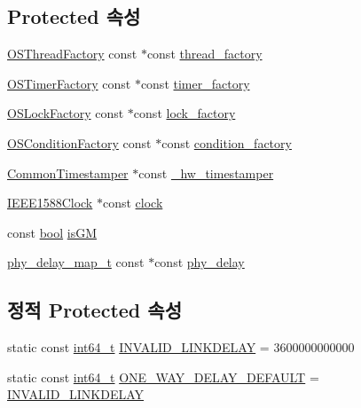 \subsection*{Protected 속성}
\begin{DoxyCompactItemize}
\item 
\hyperlink{class_o_s_thread_factory}{O\+S\+Thread\+Factory} const $\ast$const \hyperlink{class_common_port_a2268fc1f22a57c22f52a6cd1a2d2c609}{thread\+\_\+factory}
\item 
\hyperlink{class_o_s_timer_factory}{O\+S\+Timer\+Factory} const $\ast$const \hyperlink{class_common_port_a0603401af06940a9018688e0030e68e5}{timer\+\_\+factory}
\item 
\hyperlink{class_o_s_lock_factory}{O\+S\+Lock\+Factory} const $\ast$const \hyperlink{class_common_port_a79c67e28bcaacaa0f11c04682d085b36}{lock\+\_\+factory}
\item 
\hyperlink{class_o_s_condition_factory}{O\+S\+Condition\+Factory} const $\ast$const \hyperlink{class_common_port_a91ea953f424f90ddff06dc5a6fa00fb1}{condition\+\_\+factory}
\item 
\hyperlink{class_common_timestamper}{Common\+Timestamper} $\ast$const \hyperlink{class_common_port_a6b964d49ce26b21cc984b14102973f87}{\+\_\+hw\+\_\+timestamper}
\item 
\hyperlink{class_i_e_e_e1588_clock}{I\+E\+E\+E1588\+Clock} $\ast$const \hyperlink{class_common_port_aa2bc8731fa5aeb5b033feebc2b67258c}{clock}
\item 
const \hyperlink{avb__gptp_8h_af6a258d8f3ee5206d682d799316314b1}{bool} \hyperlink{class_common_port_a3e52b9e84817ee3877eb51e6e0cba296}{is\+GM}
\item 
\hyperlink{common__port_8hpp_a3fdbc1f6eb18af9243571ba14c1e1f63}{phy\+\_\+delay\+\_\+map\+\_\+t} const $\ast$const \hyperlink{class_common_port_aa00ef04a42536f5b6a5086467cd1e968}{phy\+\_\+delay}
\end{DoxyCompactItemize}
\subsection*{정적 Protected 속성}
\begin{DoxyCompactItemize}
\item 
static const \hyperlink{parse_8c_a67a9885ef4908cb72ce26d75b694386c}{int64\+\_\+t} \hyperlink{class_common_port_a12f51c79445b27ce04e3693f4d5093d7}{I\+N\+V\+A\+L\+I\+D\+\_\+\+L\+I\+N\+K\+D\+E\+L\+AY} = 3600000000000
\item 
static const \hyperlink{parse_8c_a67a9885ef4908cb72ce26d75b694386c}{int64\+\_\+t} \hyperlink{class_common_port_a1b98444ef2ff94e8f85b04c61cf42f56}{O\+N\+E\+\_\+\+W\+A\+Y\+\_\+\+D\+E\+L\+A\+Y\+\_\+\+D\+E\+F\+A\+U\+LT} = \hyperlink{class_common_port_a12f51c79445b27ce04e3693f4d5093d7}{I\+N\+V\+A\+L\+I\+D\+\_\+\+L\+I\+N\+K\+D\+E\+L\+AY}
\end{DoxyCompactItemize}

